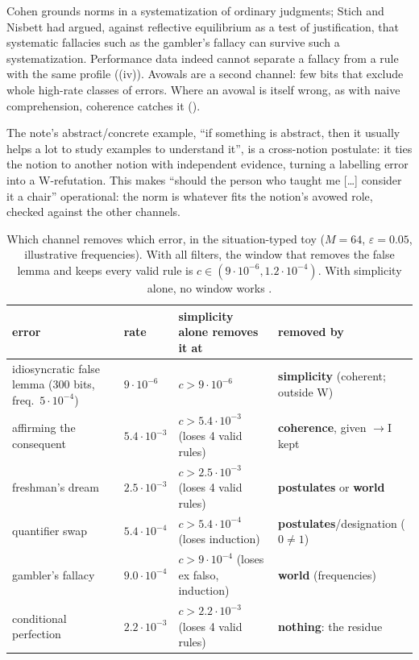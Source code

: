 Cohen grounds norms in a systematization of ordinary judgments; Stich and Nisbett had argued, against reflective equilibrium as a test of justification, that systematic fallacies such as the gambler's fallacy can survive such a systematization. Performance data indeed cannot separate a fallacy from a rule with the same profile ((iv)). Avowals are a second channel: few bits that exclude whole high-rate classes of errors. Where an avowal is itself wrong, as with naive comprehension, coherence catches it ().

The note's abstract/concrete example, ``if something is abstract, then it usually helps a lot to study examples to understand it'', is a cross-notion postulate: it ties the notion to another notion with independent evidence, turning a labelling error into a W-refutation. This makes ``should the person who taught me [\dots] consider it a chair'' operational: the norm is whatever fits the notion's avowed role, checked against the other channels.

\begin{table}[t]
\centering\footnotesize
\begin{tabularx}{\textwidth}{@{}>{\raggedright\arraybackslash}Xll>{\raggedright\arraybackslash}X@{}}
\toprule
error & rate & simplicity alone removes it at & removed by\\
\midrule
idiosyncratic false lemma (300 bits, freq.\ $5\cdot10^{-4}$) & $9\cdot10^{-6}$ & $c>9\cdot10^{-6}$ & \textbf{simplicity} (coherent; outside W)\\
affirming the consequent & $5.4\cdot10^{-3}$ & $c>5.4\cdot10^{-3}$ (loses 4 valid rules) & \textbf{coherence}, given ${\to}$I kept\\
freshman's dream & $2.5\cdot10^{-3}$ & $c>2.5\cdot10^{-3}$ (loses 4 valid rules) & \textbf{postulates} or \textbf{world}\\
quantifier swap & $5.4\cdot10^{-4}$ & $c>5.4\cdot10^{-4}$ (loses induction) & \textbf{postulates}/designation ($0\neq1$)\\
gambler's fallacy & $9.0\cdot10^{-4}$ & $c>9\cdot10^{-4}$ (loses ex falso, induction) & \textbf{world} (frequencies)\\
conditional perfection & $2.2\cdot10^{-3}$ & $c>2.2\cdot10^{-3}$ (loses 4 valid rules) & \textbf{nothing}: the residue\\
\bottomrule
\end{tabularx}
\caption{Which channel removes which error, in the situation-typed toy ($M=64$, $\varepsilon=0.05$, illustrative frequencies). With all filters, the window that removes the false lemma and keeps every valid rule is $c\in(9\cdot10^{-6},1.2\cdot10^{-4})$. With simplicity alone, no window works .}
\label{tab:simplicity:toy}
\end{table}

